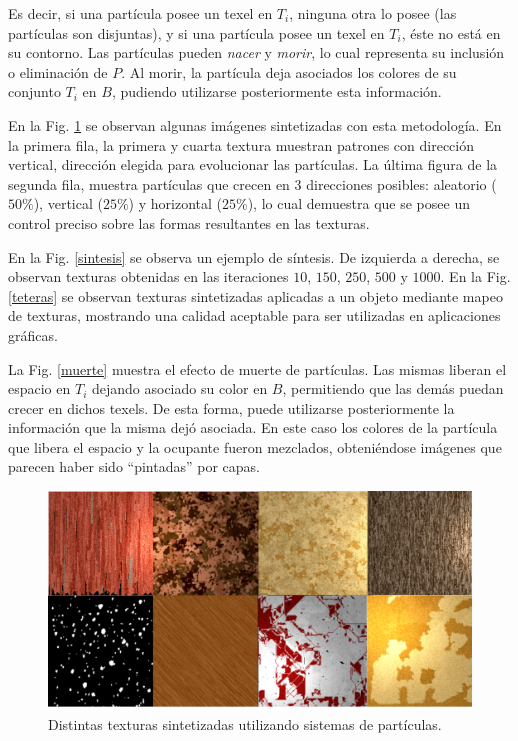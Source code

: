 Es decir, si una part\'icula posee un texel en $T_{i}$, ninguna otra lo posee (las part\'iculas son disjuntas), y si una part\'icula posee un texel en $T_{i}$, \'este no est\'a en su contorno.
Las part\'iculas pueden {\em nacer} y {\em morir}, lo cual representa su inclusi\'on o eliminaci\'on de $P$.
Al morir, la part\'icula deja asociados los colores de su conjunto $T_{i}$ en $B$, pudiendo utilizarse posteriormente esta informaci\'on.

En la Fig. \ref{resultados} se observan algunas im\'agenes sintetizadas con esta metodología.
En la primera fila, la primera y cuarta textura muestran patrones con direcci\'on vertical, direcci\'on elegida para evolucionar las part\'iculas.
La \'ultima figura de la segunda fila, muestra part\'iculas que crecen en 3 direcciones posibles: aleatorio ($50\%$), vertical ($25\%$) y horizontal ($25\%$), lo cual demuestra que se posee un control preciso sobre las formas resultantes en las texturas.

En la Fig. \ref{sintesis} se observa un ejemplo de s\'intesis.
De izquierda a derecha, se observan texturas obtenidas en las iteraciones $10$, $150$, $250$, $500$ y $1000$.
En la Fig. \ref{teteras} se observan texturas sintetizadas aplicadas a un objeto mediante mapeo de texturas, mostrando una calidad aceptable para ser utilizadas en aplicaciones gr\'aficas.

La Fig. \ref{muerte} muestra el efecto de muerte de part\'iculas.
Las mismas liberan el espacio en $T_{i}$ dejando asociado su color en $B$, permitiendo que las dem\'as puedan crecer en dichos texels.
De esta forma, puede utilizarse posteriormente la informaci\'on que la misma dej\'o asociada.
En este caso los colores de la part\'icula que libera el espacio y la ocupante fueron mezclados, obteni\'endose im\'agenes que parecen haber sido ``pintadas'' por capas.


\begin{figure}[t!]
\centering
\includegraphics[scale=0.18]{figures/resultados}
\caption{Distintas texturas sintetizadas utilizando sistemas de partículas.}
\label{resultados}
\end{figure}

